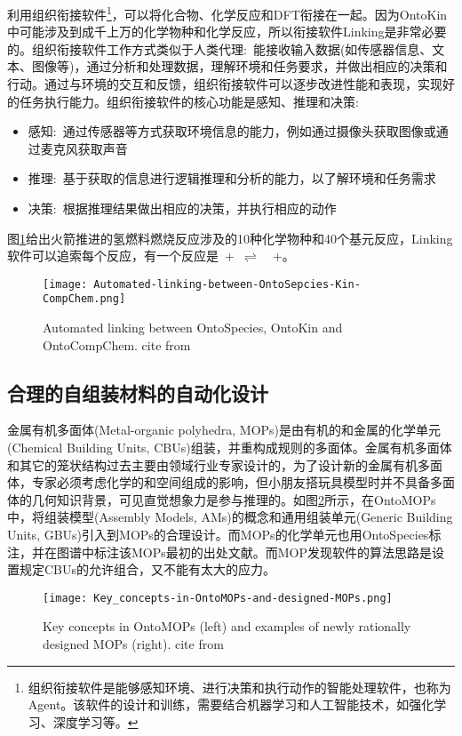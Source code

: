 利用组织衔接软件\footnote{组织衔接软件是能够感知环境、进行决策和执行动作的智能处理软件，也称为\textrm{Agent}。该软件的设计和训练，需要结合机器学习和人工智能技术，如强化学习、深度学习等。}，可以将化合物、化学反应和\textrm{DFT}衔接在一起。因为\textrm{OntoKin}中可能涉及到成千上万的化学物种和化学反应，所以衔接软件\textrm{Linking}是非常必要的。组织衔接软件工作方式类似于人类代理:~能接收输入数据(如传感器信息、文本、图像等)，通过分析和处理数据，理解环境和任务要求，并做出相应的决策和行动。通过与环境的交互和反馈，组织衔接软件可以逐步改进性能和表现，实现好的任务执行能力。组织衔接软件的核心功能是感知、推理和决策:
\begin{itemize}
	\item 感知:~通过传感器等方式获取环境信息的能力，例如通过摄像头获取图像或通过麦克风获取声音
	\item 推理:~基于获取的信息进行逻辑推理和分析的能力，以了解环境和任务需求
	\item 决策:~根据推理结果做出相应的决策，并执行相应的动作 
\end{itemize}
图\ref{Fig:Automated-linking-between-OntoSpecies-Kin-CompChem}给出火箭推进的氢燃料燃烧反应涉及的10种化学物种和40个基元反应，\textrm{Linking}软件可以追索每个反应，有一个反应是~+~$\rightleftharpoons$~~+。
\begin{figure}[h!]
\centering
\texttt{[image: Automated-linking-between-OntoSepcies-Kin-CompChem.png]}
\caption{\small\textrm{Automated linking between OntoSpecies, OntoKin and OntoCompChem. cite from\cite{ACR56-128_2023}}}%
\label{Fig:Automated-linking-between-OntoSpecies-Kin-CompChem}
\end{figure}
\subsection{合理的自组装材料的自动化设计}
金属有机多面体\textrm{(Metal-organic polyhedra, MOPs)}是由有机的和金属的化学单元\textrm{(Chemical Building Units, CBUs)}组装，并重构成规则的多面体。金属有机多面体和其它的笼状结构过去主要由领域行业专家设计的，为了设计新的金属有机多面体，专家必须考虑化学的和空间组成的影响，但小朋友搭玩具模型时并不具备多面体的几何知识背景，可见直觉想象力是参与推理的。如图\ref{Fig:OntoMOPs-MOPs}所示，在\textrm{OntoMOPs}中，将组装模型\textrm{(Assembly Models, AMs)}的概念和通用组装单元\textrm{(Generic Building Units, GBUs)}引入到\textrm{MOPs}的合理设计。而\textrm{MOPs}的化学单元也用\textrm{OntoSpecies}标注，并在图谱中标注该\textrm{MOPs}最初的出处文献。而\textrm{MOP}发现软件的算法思路是设置规定\textrm{CBUs}的允许组合，又不能有太大的应力。
\begin{figure}[h!]
\centering
\texttt{[image: Key\_concepts-in-OntoMOPs-and-designed-MOPs.png]}
\caption{\small\textrm{Key concepts in OntoMOPs (left) and examples of newly rationally designed MOPs (right). cite from\cite{ACR56-128_2023}}}%
\label{Fig:OntoMOPs-MOPs}
\end{figure}
